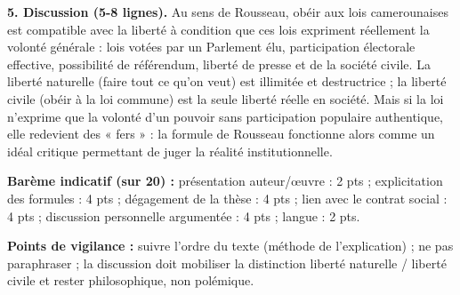 \documentclass[11pt]{article}
\begin{document}
\begin{corrige}
\textbf{5. Discussion (5-8 lignes).} Au sens de Rousseau, obéir aux lois camerounaises est compatible avec la liberté à condition que ces lois expriment réellement la volonté générale : lois votées par un Parlement élu, participation électorale effective, possibilité de référendum, liberté de presse et de la société civile. La liberté naturelle (faire tout ce qu'on veut) est illimitée et destructrice ; la liberté civile (obéir à la loi commune) est la seule liberté réelle en société. Mais si la loi n'exprime que la volonté d'un pouvoir sans participation populaire authentique, elle redevient des « fers » : la formule de Rousseau fonctionne alors comme un idéal critique permettant de juger la réalité institutionnelle.

\textbf{Barème indicatif (sur 20) :} présentation auteur/œuvre : 2 pts ; explicitation des formules : 4 pts ; dégagement de la thèse : 4 pts ; lien avec le contrat social : 4 pts ; discussion personnelle argumentée : 4 pts ; langue : 2 pts.

\textbf{Points de vigilance :} suivre l'ordre du texte (méthode de l'explication) ; ne pas paraphraser ; la discussion doit mobiliser la distinction liberté naturelle / liberté civile et rester philosophique, non polémique.

\end{corrige}
\end{document}
